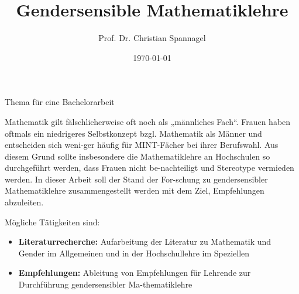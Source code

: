 \documentclass{../cssheet}
\title{Gendersensible Mathematiklehre}
\author{Prof. Dr. Christian Spannagel}
\date{\today}
\begin{document}
\vspace*{5mm}
\begin{center}
{\Large Thema für eine Bachelorarbeit}
\end{center}

\printtitle
\vspace*{1cm}

Mathematik gilt fälschlicherweise oft noch als „männliches Fach“. Frauen haben oftmals ein niedrigeres Selbstkonzept bzgl. Mathematik als Männer und entscheiden sich weni-ger häufig für MINT-Fächer bei ihrer Berufswahl. Aus diesem Grund sollte insbesondere die Mathematiklehre an Hochschulen so durchgeführt werden, dass Frauen nicht be-nachteiligt und Stereotype vermieden werden. In dieser Arbeit soll der Stand der For-schung zu gendersensibler Mathematiklehre zusammengestellt werden mit dem Ziel, Empfehlungen abzuleiten.

Mögliche Tätigkeiten sind:
\begin{itemize}
\item \textbf{Literaturrecherche:} Aufarbeitung der Literatur zu Mathematik und Gender im Allgemeinen und in der Hochschullehre im Speziellen
\item \textbf{Empfehlungen:} Ableitung von Empfehlungen für Lehrende zur Durchführung gendersensibler Ma-thematiklehre
\end{itemize}

\vspace*{10mm}

\printlicense

\printsocials
\end{document}
